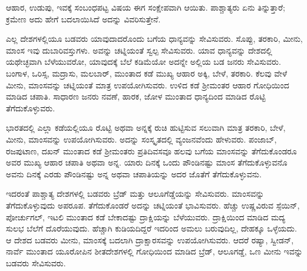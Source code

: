 ಆಹಾರ, ಉಡುಪು, ಇವಕ್ಕೆ ಸಂಬಂಧಪಟ್ಟ ವಿಷಯ ಈಗ ಸಂಕ್ಷೇಪವಾಗಿ ಆಯಿತು. ಪಾಶ್ಚಾತ್ಯರು ಏನು ತಿನ್ನುತ್ತಾರೆ; ಕ್ರಮೇಣ ಅದು ಹೇಗೆ ಬದಲಾಯಿಸಿದೆ ಅದನ್ನು ವಿವರಿಸುತ್ತೇನೆ.

ಎಲ್ಲ ದೇಶಗಳಲ್ಲಿಯೂ ಬಡವರು ಯಾವುದಾದರೊಂದು ಬಗೆಯ ಧಾನ್ಯವನ್ನು ಸೇವಿಸುವರು. ಸೊಪ್ಪು, ತರಕಾರಿ, ಮೀನು, ಮಾಂಸ ಇವು ದುಬಾರಿವಸ್ತುಗಳು. ಅವನ್ನು ಚಟ್ನಿಯಂತೆ ಸ್ವಲ್ಪ ಸೇವಿಸುವರು. ಯಾವ ಧಾನ್ಯವನ್ನು ದೇಶದಲ್ಲಿ ಯಥೇಚ್ಛವಾಗಿ ಬೆಳೆಯು\break ವರೋ, ಯಾವುದಕ್ಕೆ ಬೆಲೆ ಕಡಿಮೆಯೋ ಅದನ್ನೇ ಅಲ್ಲಿಯ ಬಡ ಜನರು ಸೇವಿಸುವರು. ಬಂಗಾಳ, ಒರಿಸ್ಸ, ಮದ್ರಾಸು, ಮಲಬಾರ್​, ಮುಂತಾದ ಕಡೆ ಮುಖ್ಯ ಆಹಾರ ಅಕ್ಕಿ, ಬೇಳೆ, ತರಕಾರಿ. ಕೆಲವು ವೇಳೆ ಮೀನು, ಮಾಂಸವನ್ನು ಚಟ್ನಿಯಂತೆ ಮಾತ್ರ ಉಪಯೋಗಿಸುವರು. ಉಳಿದ ಕಡೆ ಶ‍್ರೀಮಂತರ ಆಹಾರ ಗೋಧಿಯಿಂದ ಮಾಡಿದ ಚಪಾತಿ. ಸಾಧಾರಣ ಜನರು ನವಣೆ, ಹಾರಕ, ಜೋಳ ಮುಂತಾದ ಧಾನ್ಯದಿಂದ ಮಾಡಿದ ರೊಟ್ಟಿ ತೆಗೆದುಕೊಳ್ಳುವರು.

ಭಾರತದಲ್ಲಿ ಎಲ್ಲಾ ಕಡೆಯಲ್ಲಿಯೂ ರೊಟ್ಟಿ ಅಥವಾ ಅನ್ನಕ್ಕೆ ರುಚಿ ಹುಟ್ಟಿಸುವ ಸಲುವಾಗಿ ಮಾತ್ರ ತರಕಾರಿ, ಬೇಳೆ, ಮೀನು, ಮಾಂಸವನ್ನು ಉಪಯೋಗಿಸುವರು. ಅದನ್ನು ಸಂಸ್ಕೃತದಲ್ಲಿ ವ್ಯಂಜನವೆಂದು ಹೇಳುವರು. ಪಂಜಾಬ್​, ರಜಪುಟಾಣ, ದಖನ್​ ಮುಂತಾದ ಕಡೆ ಶ‍್ರೀಮಂತರು ಪ್ರತಿದಿವಸವೂ ಹಲವು ಬಗೆಯ ಮಾಂಸವನ್ನು ತೆಗೆದುಕೊಂಡರೂ ಅವರ ಮುಖ್ಯ ಆಹಾರ ಚಪಾತಿ ಅಥವಾ ಅನ್ನ. ಯಾರು ದಿನಕ್ಕೆ ಒಂದು ಪೌಂಡಿನಷ್ಟು ಮಾಂಸ ತೆಗೆದುಕೊಳ್ಳುವನೊ ಅವನು ದಿನಕ್ಕೆ ಎರಡು ಪೌಂಡಿನಷ್ಟು ಅನ್ನ ಅಥವಾ ಚಪಾತಿಯನ್ನು ಅದರ ಜೊತೆಗೆ ತೆಗೆದುಕೊಳ್ಳುವನು.

ಇದರಂತೆ ಪಾಶ್ಚಾತ್ಯ ದೇಶಗಳಲ್ಲಿ ಬಡವರು ಬ್ರೆಡ್​ ಮತ್ತು ಆಲೂಗೆಡ್ಡೆಯನ್ನು ಸೇವಿಸು\break ವರು. ಮಾಂಸವನ್ನು ತೆಗೆದುಕೊಳ್ಳುವುದು ಅಪರೂಪ. ತೆಗೆದುಕೊಂಡರೆ ಅದನ್ನು ಚಟ್ನಿ\break ಯಂತೆ ಭಾವಿಸುವರು. ಹೆಚ್ಚು ಉಷ್ಣವಿರುವ ಸ್ಪೆಯಿನ್​, ಪೋರ್ಚುಗಲ್​, ಇಟಲಿ ಮುಂತಾದ ಕಡೆ ಬೇಕಾದಷ್ಟು ದ್ರಾಕ್ಷಿಯನ್ನು ಬೆಳೆಯುವರು. ದ್ರಾಕ್ಷಿಯಿಂದ ಮಾಡಿದ ಮದ್ಯ ಸುಲಭ ಬೆಲೆಗೆ ದೊರೆಯುವುದು. ಹೆಚ್ಚಾಗಿ ಕುಡಿಯದಿದ್ದರೆ ಇದರಿಂದ ಅಮಲು ಬರುವುದಿಲ್ಲ, ದೇಹಕ್ಕೂ ಒಳ್ಳೆಯದು. ಆ ದೇಶದ ಬಡವರು ಮೀನು, ಮಾಂಸಕ್ಕೆ ಬದಲಾಗಿ ದ್ರಾಕ್ಷಾರಸ\break ವನ್ನು ಉಪಯೋಗಿಸುವರು. ಆದರೆ ರಷ್ಯಾ, ಸ್ವೀಡನ್​, ನಾರ್ವೆ ಮುಂತಾದ ಯೂರೋಪಿನ ಶೀತದೇಶಗಳಲ್ಲಿ ಗೋಧಿಯಿಂದ ಮಾಡಿದ ಬ್ರೆಡ್​, ಆಲೂಗಡ್ಡೆ, ಒಣ ಮೀನು ಇವನ್ನು ಬಡವರು ಸೇವಿಸುವರು.

